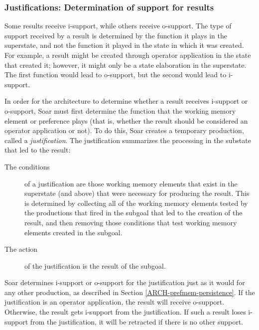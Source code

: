 \subsubsection*{Justifications: Determination of support for results}


Some results receive i-support, while others receive o-support.  The
type of support received by a result is determined by the function it
plays in the superstate, and not the function it played in the state in
which it was created. For example, a result might be created through
operator application in the state that created it; however, it might
only be a state elaboration in the superstate. The first function would
lead to o-support, but the second would lead to i-support.

In order for the architecture to determine whether a result receives i-support
or o-support, Soar must first determine the function that the working
memory element or preference plays
(that is, whether the result should be considered an operator application or
not). To do this, Soar creates a temporary production, called a
\textit{justification}. The justification summarizes the processing in the
substate that led to the result:

\vspace{-10pt}
\begin{description}
	\item[The conditions] of a justification are those working memory elements that exist in the superstate (and above) that were necessary for producing the result.  This is determined by collecting all of the working memory elements tested by the productions that fired in the subgoal that led to the creation of the result, and then removing those conditions that test working memory elements created in the subgoal.
	\vspace{-6pt}
	\item[The action] of the justification is the result of the subgoal.
\end{description} 

Soar determines i-support or o-support for the justification just as it
would for any other production, as described in Section
\ref{ARCH-prefmem-persistence}.  If the justification is an operator
application, the result will receive o-support.  Otherwise, the result
gets i-support from the justification. If such a result loses
i-support from the justification, it will be retracted if there is no
other support.

